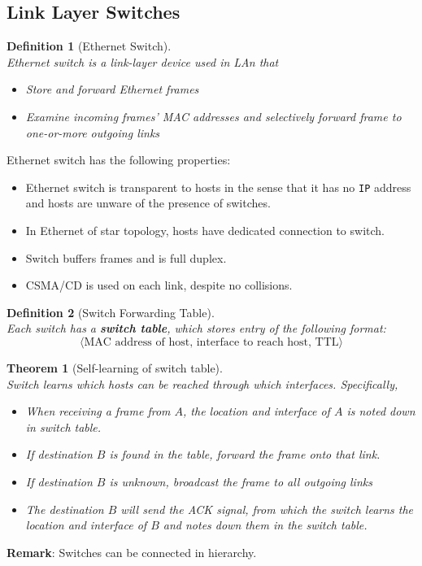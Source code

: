 \documentclass[12pt]{article}
\newcommand\IP{\texttt{IP} }
\newtheorem{definition}{Definition}[section]
\newtheorem{theorem}{Theorem}[section]
\theoremstyle{definition}
\begin{document}
\subsection{Link Layer Switches}
\begin{definition}[Ethernet Switch]
\hfill\\\normalfont Ethernet switch is a link-layer device used in LAn that 
\begin{itemize}
  \item Store and forward Ethernet frames
  \item Examine incoming frames' MAC addresses and selectively forward frame to one-or-more outgoing links
\end{itemize}
\end{definition}
Ethernet switch has the following properties:
\begin{itemize}
\item Ethernet switch is transparent to hosts in the sense that it has no \IP address and hosts are unware of the presence of switches.
\item In Ethernet of star topology, hosts have dedicated connection to switch.
\item Switch buffers frames and is full duplex.
\item CSMA/CD is used on each link, despite no collisions.
\end{itemize}
\begin{definition}[Switch Forwarding Table]
\hfill\\\normalfont Each switch has a \textbf{switch table}, which stores entry of the following format:
\[
\langle\text{MAC address of host, interface to reach host, TTL}\rangle
\]
\end{definition}
\begin{theorem}[Self-learning of switch table]
\hfill\\\normalfont Switch learns which hosts can be reached through which interfaces. Specifically,
\begin{itemize}
  \item When receiving a frame from $A$, the location and interface of $A$ is noted down in switch table.
  \item If destination $B$ is found in the table, forward the frame onto that link.
  \item If destination $B$ is unknown, broadcast the frame to all outgoing links
  \item The destination $B$ will send the ACK signal, from which the switch learns the location and interface of $B$ and notes down them in the switch table.
\end{itemize}
\end{theorem}
\textbf{Remark}: Switches can be connected in hierarchy.
\end{document}
